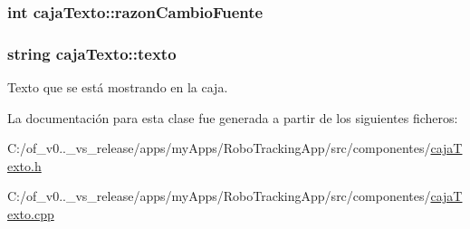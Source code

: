 \subsubsection[{razon\+Cambio\+Fuente}]{\setlength{\rightskip}{0pt plus 5cm}int caja\+Texto\+::razon\+Cambio\+Fuente\hspace{0.3cm}{\ttfamily [private]}}\label{classcaja_texto_ab5e905a37e7247d0f2b0c139ad49970e}
\hypertarget{classcaja_texto_a5b62049df6eb5efb5831b57b4958d115}{}
\subsubsection[{texto}]{\setlength{\rightskip}{0pt plus 5cm}string caja\+Texto\+::texto\hspace{0.3cm}{\ttfamily [private]}}\label{classcaja_texto_a5b62049df6eb5efb5831b57b4958d115}


Texto que se está mostrando en la caja. 



La documentación para esta clase fue generada a partir de los siguientes ficheros\+:\begin{DoxyCompactItemize}
\item 
C\+:/of\+\_\+v0..\+\_\+vs\+\_\+release/apps/my\+Apps/\+Robo\+Tracking\+App/src/componentes/\hyperlink{caja_texto_8h}{caja\+Texto.\+h}\item 
C\+:/of\+\_\+v0..\+\_\+vs\+\_\+release/apps/my\+Apps/\+Robo\+Tracking\+App/src/componentes/\hyperlink{caja_texto_8cpp}{caja\+Texto.\+cpp}\end{DoxyCompactItemize}
